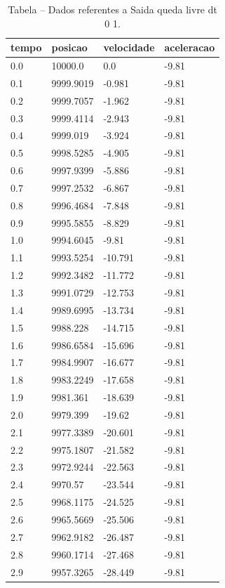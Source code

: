 \begin{table}[H]
\centering
\caption{Tabela – Dados referentes a Saida queda livre dt 0 1.}
\label{tab:saida_queda_livre_dt_0_1}
\begin{tabular}{llll}
\toprule
tempo & posicao & velocidade & aceleracao \\
\midrule
0.0 & 10000.0 & 0.0 & -9.81 \\
0.1 & 9999.9019 & -0.981 & -9.81 \\
0.2 & 9999.7057 & -1.962 & -9.81 \\
0.3 & 9999.4114 & -2.943 & -9.81 \\
0.4 & 9999.019 & -3.924 & -9.81 \\
0.5 & 9998.5285 & -4.905 & -9.81 \\
0.6 & 9997.9399 & -5.886 & -9.81 \\
0.7 & 9997.2532 & -6.867 & -9.81 \\
0.8 & 9996.4684 & -7.848 & -9.81 \\
0.9 & 9995.5855 & -8.829 & -9.81 \\
1.0 & 9994.6045 & -9.81 & -9.81 \\
1.1 & 9993.5254 & -10.791 & -9.81 \\
1.2 & 9992.3482 & -11.772 & -9.81 \\
1.3 & 9991.0729 & -12.753 & -9.81 \\
1.4 & 9989.6995 & -13.734 & -9.81 \\
1.5 & 9988.228 & -14.715 & -9.81 \\
1.6 & 9986.6584 & -15.696 & -9.81 \\
1.7 & 9984.9907 & -16.677 & -9.81 \\
1.8 & 9983.2249 & -17.658 & -9.81 \\
1.9 & 9981.361 & -18.639 & -9.81 \\
2.0 & 9979.399 & -19.62 & -9.81 \\
2.1 & 9977.3389 & -20.601 & -9.81 \\
2.2 & 9975.1807 & -21.582 & -9.81 \\
2.3 & 9972.9244 & -22.563 & -9.81 \\
2.4 & 9970.57 & -23.544 & -9.81 \\
2.5 & 9968.1175 & -24.525 & -9.81 \\
2.6 & 9965.5669 & -25.506 & -9.81 \\
2.7 & 9962.9182 & -26.487 & -9.81 \\
2.8 & 9960.1714 & -27.468 & -9.81 \\
2.9 & 9957.3265 & -28.449 & -9.81 \\

\end{tabular}
\end{table}
